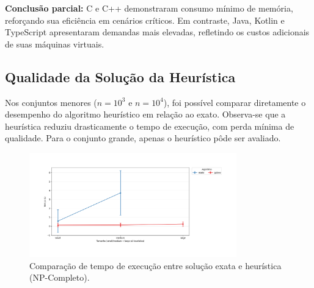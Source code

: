 \documentclass[12pt, a4paper]{article}
\begin{document}
\textbf{Conclusão parcial:} C e C++ demonstraram consumo mínimo de memória, reforçando sua eficiência em cenários críticos. Em contraste, Java, Kotlin e TypeScript apresentaram demandas mais elevadas, refletindo os custos adicionais de suas máquinas virtuais.

\subsection{Qualidade da Solução da Heurística}

Nos conjuntos menores (\(n = 10^3\) e \(n = 10^4\)), foi possível comparar diretamente o desempenho do algoritmo heurístico em relação ao exato. Observa-se que a heurística reduziu drasticamente o tempo de execução, com perda mínima de qualidade. Para o conjunto grande, apenas o heurístico pôde ser avaliado.

\begin{figure}[H]
    \centering
    \includegraphics[width=0.8\textwidth]{img/qualidade_heuristica.png}
    \caption{Comparação de tempo de execução entre solução exata e heurística (NP-Completo).}
    \label{fig:qualidade}
\end{figure}

\begin{table}[H]
    \centering
    \caption{Comparação de tempo de execução entre solução exata e heurística (NP-Completo).}
    \label{tab:qualidade_np}
\end{table}
\end{document}
